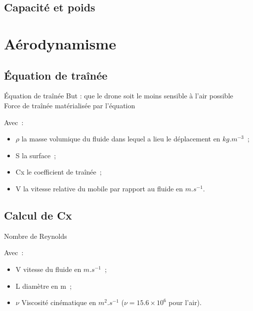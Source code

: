 \documentclass{beamer}
\begin{document}
\subsection{Capacité et poids}

\section{Aérodynamisme}

\subsection{Équation de traînée}
\begin{frame}{Équation de traînée}
 But : que le drone soit le moins sensible à l'air possible \\
 Force de traînée matérialisée par l'équation \\
 \begin{center}
 \end{center}
 Avec~:
 \begin{itemize}
  \item $\rho$ la masse volumique du fluide dans lequel a lieu le déplacement en $kg.m^{-3}$~;
  \item S la surface~;
  \item Cx le coefficient de traînée~;
  \item V la vitesse relative du mobile par rapport au fluide en $m.s^{-1}$.
 \end{itemize} 
\end{frame}

\subsection{Calcul de Cx}
\begin{frame}{Nombre de Reynolds}
 \begin{center}
 \end{center}
 Avec~: \\
 \begin{itemize}
  \item V vitesse du fluide en $m.s^{-1}$~;
  \item L diamètre en m~;
  \item $\nu$ Viscosité cinématique en $m^2.s^{-1}$ ($\nu = 15.6 \times 10^6$ pour l'air).
 \end{itemize} 
\end{frame}
\end{document}
